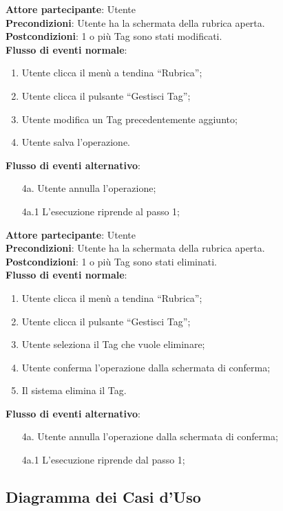 \begin{tcolorbox}[colback=white,colframe=black!80!white,title=\textbf{C9 - Modificare Tag}]
	\textbf{Attore partecipante}: Utente
	\\\textbf{Precondizioni}: Utente ha la schermata della rubrica aperta. 
	\\\textbf{Postcondizioni}: 1 o più Tag sono stati modificati.
	\\\textbf{Flusso di eventi normale}:
	\begin{enumerate}[noitemsep, topsep=0pt]
		\item Utente clicca il menù a tendina “Rubrica”;
		\item Utente clicca il pulsante “Gestisci Tag”;
	\item 	Utente modifica un Tag precedentemente aggiunto;
	\item 	Utente salva l’operazione.		
	\end{enumerate}
	\textbf{Flusso di eventi alternativo}:
	\begin{itemize}[noitemsep, topsep=0pt]
		\item[4a. ] Utente annulla l’operazione;
		\item[4a.1] L’esecuzione riprende al passo 1;		
	\end{itemize}
\end{tcolorbox}

\begin{tcolorbox}[colback=white,colframe=black!80!white,title=\textbf{C10 - Eliminare Tag}]
	\textbf{Attore partecipante}: Utente
	\\\textbf{Precondizioni}: Utente ha la schermata della rubrica aperta.
	\\\textbf{Postcondizioni}: 1 o più Tag sono stati eliminati.
	\\\textbf{Flusso di eventi normale}:
	\begin{enumerate}[noitemsep, topsep=0pt]
		\item Utente clicca il menù a tendina “Rubrica”;
	\item	Utente clicca il pulsante “Gestisci Tag”;
	\item	Utente seleziona il Tag che vuole eliminare;
	\item	Utente conferma l’operazione dalla schermata di conferma;
	\item	Il sistema elimina il Tag.
	\end{enumerate}
	\textbf{Flusso di eventi alternativo}:
	\begin{itemize}[noitemsep, topsep=0pt]
		\item[4a. ] Utente annulla l’operazione dalla schermata di conferma;
		\item[4a.1] L’esecuzione riprende dal passo 1;		
	\end{itemize}
\end{tcolorbox}

\subsection{Diagramma dei Casi d'Uso}